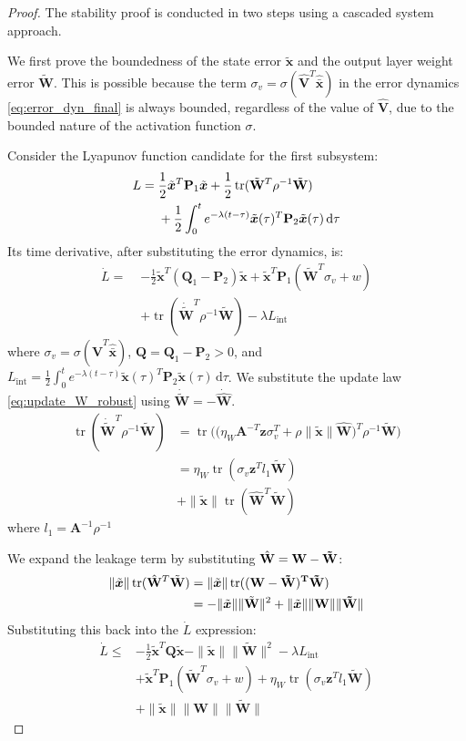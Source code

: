 \documentclass[10pt,twocolumn]{ICCAS}
\newcommand{\tr}{\operatorname{tr}}
\newcommand{\ud}{\,\mathrm{d}}
\newcommand{\xtilde}{\tilde{\bm{x}}}
\newcommand{\xhatbar}{\hat{\bar{\bm{x}}}}
\newcommand{\Wtilde}{\tilde{\mathbf{W}}}
\newcommand{\What}{\hat{\mathbf{W}}}
\newcommand{\Vhat}{\hat{\mathbf{V}}}
\begin{document}
\begin{proof}
The stability proof is conducted in two steps using a cascaded system approach.


We first prove the boundedness of the state error $\xtilde$ and the output layer weight error $\Wtilde$. This is possible because the term $\sigma_v = \sigma(\Vhat^T \xhatbar)$ in the error dynamics \eqref{eq:error_dyn_final} is always bounded, regardless of the value of $\Vhat$, due to the bounded nature of the activation function $\sigma$.

Consider the Lyapunov function candidate for the first subsystem:
\begin{align}
    L =\; & \frac{1}{2}\xtilde^T \mathbf{P}_1 \xtilde \notag + \frac{1}{2}\tr(\Wtilde^T \rho^{-1}\Wtilde) \notag \\
    & + \frac{1}{2} \int_{0}^{t} e^{-\lambda(t-\tau)} \xtilde(\tau)^T \mathbf{P}_2 \xtilde(\tau) \ud\tau
\end{align}
Its time derivative, after substituting the error dynamics, is:
\begin{align*}
    \dot{L} =\; & -\frac{1}{2}\xtilde^T(\mathbf{Q}_1 - \mathbf{P}_2)\xtilde+ \xtilde^T\mathbf{P}_1 (\Wtilde^T \sigma_v + w) \\
    &+ \tr(\dot{\Wtilde}^T\rho^{-1} \Wtilde) - \lambda L_{\text{int}}
\end{align*}
where $\sigma_v = \sigma(\Vhat^T\xhatbar)$, $\mathbf{Q} = \mathbf{Q}_1 - \mathbf{P}_2 > 0$, and $L_{\text{int}} = \frac{1}{2} \int_{0}^{t} e^{-\lambda(t-\tau)} \xtilde(\tau)^T \mathbf{P}_2 \xtilde(\tau) \ud\tau$.
We substitute the update law \eqref{eq:update_W_robust} using $\dot{\Wtilde} = -\dot{\What}$. 
\begin{align*}
    \tr(\dot{\Wtilde}^T \rho^{-1}\Wtilde) 
    &= \tr\Big( \big(\eta_W \mathbf{A}^{-T}\bm{z}\sigma_v^T + \rho \|\xtilde\| \What\big)^T \rho^{-1}\Wtilde \Big) \\
    &= {\eta_W}\tr(\sigma_v \bm{z}^T l_1 \Wtilde)\\
    &+ \|\xtilde\| \tr(\What^T \Wtilde)
\end{align*}
where $l_1 = \mathbf{A}^{-1} \rho^{-1}$ 

We expand the leakage term by substituting $\What =\bf{W} - \Wtilde$:
\begin{align*}
    \|\xtilde\| \tr(\What^T\Wtilde) &= \|\xtilde\| \tr((\bf{W} - \Wtilde)^T\Wtilde)\\&= -\|\xtilde\| \|\Wtilde\|^{2}+\|\xtilde\| \|\bf{W}\|\|\Wtilde\|
\end{align*}
Substituting this back into the $\dot{L}$ expression:
\begin{align*}
    \dot{L} \le &-\frac{1}{2}\xtilde^T\mathbf{Q}\xtilde  -\|\xtilde\| \|\Wtilde\|^{2} - \lambda L_{\text{int}} \\
    & + \xtilde^T\mathbf{P}_{1} (\Wtilde^T \sigma_v + w) + \eta_W \tr(\sigma_v {\bm{z}^T} l_{1} \Wtilde) \\
    &+  \|\xtilde\| \|\mathbf{W}\|\|\Wtilde\|
\end{align*}


\end{proof}
\end{document}
